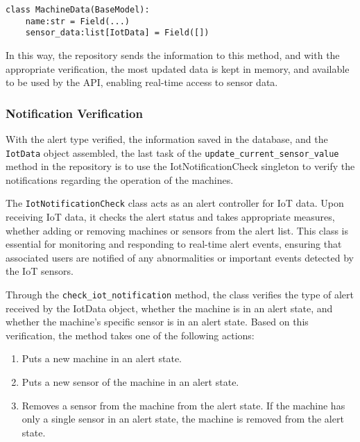 \begin{verbatim}
class MachineData(BaseModel):
    name:str = Field(...)
    sensor_data:list[IotData] = Field([])
\end{verbatim}

In this way, the repository sends the information to this method, and with the appropriate verification, the most updated data is kept in memory, and available to be used by the \gls{API}, enabling real-time access to sensor data.

\subsubsection{Notification Verification}
With the alert type verified, the information saved in the database, and the \texttt{IotData} object assembled, the last task of the \texttt{update\_current\_sensor\_value} method in the repository is to use the IotNotificationCheck singleton to verify the notifications regarding the operation of the machines.

The \texttt{IotNotificationCheck} class acts as an alert controller for IoT data. Upon receiving IoT data, it checks the alert status and takes appropriate measures, whether adding or removing machines or sensors from the alert list. This class is essential for monitoring and responding to real-time alert events, ensuring that associated users are notified of any abnormalities or important events detected by the IoT sensors.

Through the \texttt{check\_iot\_notification} method, the class verifies the type of alert received by the IotData object, whether the machine is in an alert state, and whether the machine's specific sensor is in an alert state. Based on this verification, the method takes one of the following actions:

\begin{enumerate}
    \item Puts a new machine in an alert state.
    \item Puts a new sensor of the machine in an alert state.
    \item Removes a sensor from the machine from the alert state. If the machine has only a single sensor in an alert state, the machine is removed from the alert state.
\end{enumerate}


